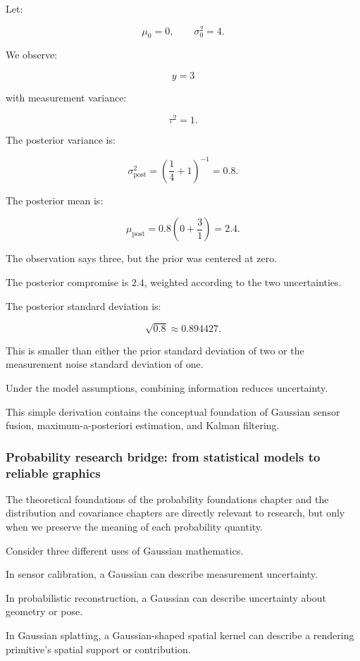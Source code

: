Let:

\[
 \mu_0=0,\qquad \sigma_0^2=4.
\]

We observe:

\[
 y=3
\]

with measurement variance:

\[
 \tau^2=1.
\]

The posterior variance is:

\[
 \sigma_{\mathrm{post}}^2= \left(\frac14+1\right)^{-1} =\boxed{0.8}.
\]

The posterior mean is:

\[
 \mu_{\mathrm{post}} = 0.8\left(0+\frac31\right) =\boxed{2.4}.
\]

The observation says three, but the prior was centered at zero.

The posterior compromise is \(2.4\), weighted according to the two uncertainties.

The posterior standard deviation is:

\[
 \sqrt{0.8}\approx0.894427.
\]

This is smaller than either the prior standard deviation of two or the measurement noise standard deviation of one.

Under the model assumptions, combining information reduces uncertainty.

This simple derivation contains the conceptual foundation of Gaussian sensor fusion, maximum-a-posteriori estimation, and Kalman filtering.

\subsubsection{Probability research bridge: from statistical models to reliable graphics}\label{probability-research-bridge-from-statistical-models-to-reliable-graphics}

The theoretical foundations of the probability foundations chapter and the distribution and covariance chapters are directly relevant to research, but only when we preserve the meaning of each probability quantity.

Consider three different uses of Gaussian mathematics.

In sensor calibration, a Gaussian can describe measurement uncertainty.

In probabilistic reconstruction, a Gaussian can describe uncertainty about geometry or pose.

In Gaussian splatting, a Gaussian-shaped spatial kernel can describe a rendering primitive's spatial support or contribution.

